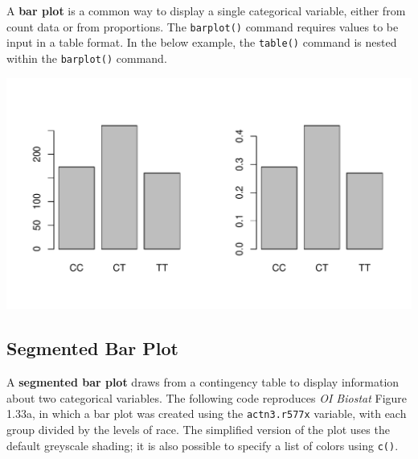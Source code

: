 A \textbf{bar plot} is a common way to display a single categorical variable, either from count data or from proportions. The \texttt{barplot()} command requires values to be input in a table format. In the below example, the \texttt{table()} command is nested within the \texttt{barplot()} command.

\begin{knitrout}
\color{fgcolor}\begin{kframe}
\begin{alltt}
\hlstd{(} \hlstd{=} \hlstd{(}\hlstd{,} \hlstd{))}
\hlstd{(}\hlopt{$}  
\hlstd{(}\hlopt{$}\hlopt{/}\hlstd{(}\hlopt{$}  
\end{alltt}
\end{kframe}
\includegraphics[width=\maxwidth]{figure/unnamed-chunk-34-1} 

\end{knitrout}

\newpage

\subsection{Segmented Bar Plot}

A \textbf{segmented bar plot} draws from a contingency table to display information about two categorical variables. The following code reproduces \textit{OI Biostat} Figure 1.33a, in which a bar plot was created using the \texttt{actn3.r577x} variable, with each group divided by the levels of race. The simplified version of the plot uses the default greyscale shading; it is also possible to specify a list of colors using \texttt{c()}. 

